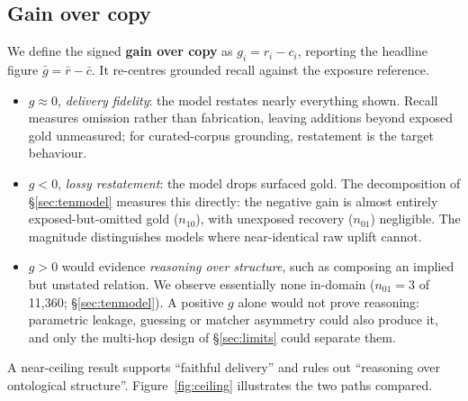 \documentclass[10pt,twocolumn]{article}
\begin{document}
\subsection{Gain over copy}
We define the signed \textbf{gain over copy} as $g_i=r_i-c_i$, reporting the headline figure $\bar g=\bar r-\bar c$. It re-centres grounded recall against the exposure reference.
\begin{itemize}[topsep=2pt,itemsep=1pt,leftmargin=1.4em]
\item $g\approx0$, \emph{delivery fidelity}: the model restates nearly everything shown. Recall measures omission rather than fabrication, leaving additions beyond exposed gold unmeasured; for curated-corpus grounding, restatement is the target behaviour.
\item $g<0$, \emph{lossy restatement}: the model drops surfaced gold. The decomposition of \S\ref{sec:tenmodel} measures this directly: the negative gain is almost entirely exposed-but-omitted gold ($n_{10}$), with unexposed recovery ($n_{01}$) negligible. The magnitude distinguishes models where near-identical raw uplift cannot.
\item $g>0$ would evidence \emph{reasoning over structure}, such as composing an implied but unstated relation. We observe essentially none in-domain ($n_{01}=3$ of 11{,}360; \S\ref{sec:tenmodel}). A positive $g$ alone would not prove reasoning: parametric leakage, guessing or matcher asymmetry could also produce it, and only the multi-hop design of \S\ref{sec:limits} could separate them.
\end{itemize}
A near-ceiling result supports ``faithful delivery'' and rules out ``reasoning over ontological structure''. Figure~\ref{fig:ceiling} illustrates the two paths compared.


\end{document}
